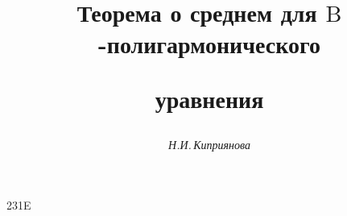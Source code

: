 









\newcommand{\im}{\operatorname{Im}}


\newcommand{\supp}{\operatorname{supp}}


\newcommand{\nts}{\negthickspace}


\newsymbol\Diag 231E


\newcommand{\myint}{\Diag\nts\nts\nts\nts@!@!@!\int}


\newcommand{\tts}[1]{}







 


\setcounter{page}{31}












\author{\it Н.И.\,Киприянова}




\title{Теорема о среднем для $\mathrm B$-полигармонического


уравнения}





\date{}







\pagestyle{plain} %








